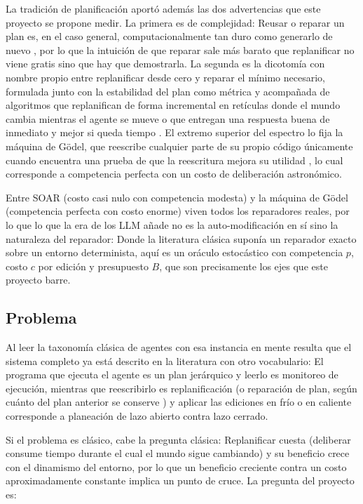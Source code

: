La tradición de planificación aportó además las dos advertencias que este proyecto se propone medir. La primera es de complejidad: Reusar o reparar un plan es, en el caso general, computacionalmente tan duro como generarlo de nuevo \parencite{nebel1995plan}, por lo que la intuición de que reparar sale más barato que replanificar no viene gratis sino que hay que demostrarla. La segunda es la dicotomía con nombre propio entre replanificar desde cero y reparar el mínimo necesario, formulada junto con la estabilidad del plan como métrica \parencite{fox2006plan} y acompañada de algoritmos que replanifican de forma incremental en retículas donde el mundo cambia mientras el agente se mueve \parencite{koenig2002dlite} o que entregan una respuesta buena de inmediato y mejor si queda tiempo \parencite{likhachev2003ara}. El extremo superior del espectro lo fija la máquina de Gödel, que reescribe cualquier parte de su propio código únicamente cuando encuentra una prueba de que la reescritura mejora su utilidad \parencite{schmidhuber2003goedel}, lo cual corresponde a competencia perfecta con un costo de deliberación astronómico.

Entre SOAR (costo casi nulo con competencia modesta) y la máquina de Gödel (competencia perfecta con costo enorme) viven todos los reparadores reales, por lo que lo que la era de los LLM añade no es la auto-modificación en sí sino la naturaleza del reparador: Donde la literatura clásica suponía un reparador exacto sobre un entorno determinista, aquí es un oráculo estocástico con competencia $p$, costo $c$ por edición y presupuesto $B$, que son precisamente los ejes que este proyecto barre.

\subsection*{Problema}

Al leer la taxonomía clásica de agentes con esa instancia en mente \parencite{russellNorvig2020} resulta que el sistema completo ya está descrito en la literatura con otro vocabulario: El programa que ejecuta el agente es un plan jerárquico y leerlo es monitoreo de ejecución, mientras que reescribirlo es replanificación (o reparación de plan, según cuánto del plan anterior se conserve \parencite{fox2006plan}) y aplicar las ediciones en frío o en caliente corresponde a planeación de lazo abierto contra lazo cerrado.

Si el problema es clásico, cabe la pregunta clásica: Replanificar cuesta (deliberar consume tiempo durante el cual el mundo sigue cambiando) y su beneficio crece con el dinamismo del entorno, por lo que un beneficio creciente contra un costo aproximadamente constante implica un punto de cruce. La pregunta del proyecto es:

